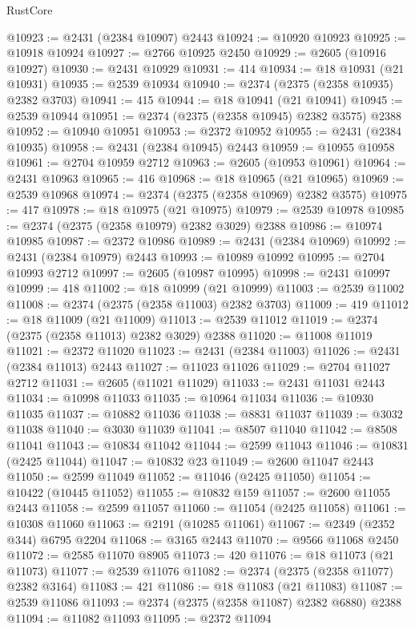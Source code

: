 \begin{lexlean}{RustCore}
\begin{coremodule}
@10923 := @2431 (@2384 @10907) @2443
@10924 := @10920 @10923
@10925 := @10918 @10924
@10927 := @2766 @10925 @2450
@10929 := @2605 (@10916 @10927)
@10930 := @2431 @10929
@10931 := 414
@10934 := @18 @10931 (@21 @10931)
@10935 := @2539 @10934
@10940 := @2374 (@2375 (@2358 @10935) @2382 @3703)
@10941 := 415
@10944 := @18 @10941 (@21 @10941)
@10945 := @2539 @10944
@10951 := @2374 (@2375 (@2358 @10945) @2382 @3575) @2388
@10952 := @10940 @10951
@10953 := @2372 @10952
@10955 := @2431 (@2384 @10935)
@10958 := @2431 (@2384 @10945) @2443
@10959 := @10955 @10958
@10961 := @2704 @10959 @2712
@10963 := @2605 (@10953 @10961)
@10964 := @2431 @10963
@10965 := 416
@10968 := @18 @10965 (@21 @10965)
@10969 := @2539 @10968
@10974 := @2374 (@2375 (@2358 @10969) @2382 @3575)
@10975 := 417
@10978 := @18 @10975 (@21 @10975)
@10979 := @2539 @10978
@10985 := @2374 (@2375 (@2358 @10979) @2382 @3029) @2388
@10986 := @10974 @10985
@10987 := @2372 @10986
@10989 := @2431 (@2384 @10969)
@10992 := @2431 (@2384 @10979) @2443
@10993 := @10989 @10992
@10995 := @2704 @10993 @2712
@10997 := @2605 (@10987 @10995)
@10998 := @2431 @10997
@10999 := 418
@11002 := @18 @10999 (@21 @10999)
@11003 := @2539 @11002
@11008 := @2374 (@2375 (@2358 @11003) @2382 @3703)
@11009 := 419
@11012 := @18 @11009 (@21 @11009)
@11013 := @2539 @11012
@11019 := @2374 (@2375 (@2358 @11013) @2382 @3029) @2388
@11020 := @11008 @11019
@11021 := @2372 @11020
@11023 := @2431 (@2384 @11003)
@11026 := @2431 (@2384 @11013) @2443
@11027 := @11023 @11026
@11029 := @2704 @11027 @2712
@11031 := @2605 (@11021 @11029)
@11033 := @2431 @11031 @2443
@11034 := @10998 @11033
@11035 := @10964 @11034
@11036 := @10930 @11035
@11037 := @10882 @11036
@11038 := @8831 @11037
@11039 := @3032 @11038
@11040 := @3030 @11039
@11041 := @8507 @11040
@11042 := @8508 @11041
@11043 := @10834 @11042
@11044 := @2599 @11043
@11046 := @10831 (@2425 @11044)
@11047 := @10832 @23
@11049 := @2600 @11047 @2443
@11050 := @2599 @11049
@11052 := @11046 (@2425 @11050)
@11054 := @10422 (@10445 @11052)
@11055 := @10832 @159
@11057 := @2600 @11055 @2443
@11058 := @2599 @11057
@11060 := @11054 (@2425 @11058)
@11061 := @10308 @11060
@11063 := @2191 (@10285 @11061)
@11067 := @2349 (@2352 @344) @6795 @2204
@11068 := @3165 @2443
@11070 := @9566 @11068 @2450
@11072 := @2585 @11070 @8905
@11073 := 420
@11076 := @18 @11073 (@21 @11073)
@11077 := @2539 @11076
@11082 := @2374 (@2375 (@2358 @11077) @2382 @3164)
@11083 := 421
@11086 := @18 @11083 (@21 @11083)
@11087 := @2539 @11086
@11093 := @2374 (@2375 (@2358 @11087) @2382 @6880) @2388
@11094 := @11082 @11093
@11095 := @2372 @11094

\end{coremodule}
\end{lexlean}

